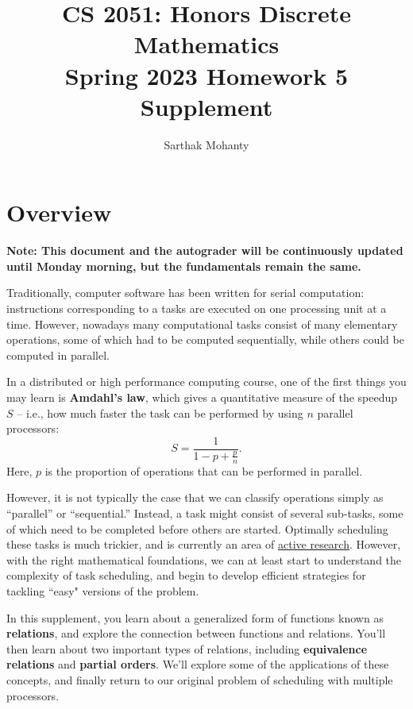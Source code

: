 \documentclass{article}
\title{\vspace{-1cm}CS 2051: Honors Discrete Mathematics \\Spring 2023 Homework 5 Supplement}
\author{Sarthak Mohanty }
\date{}
\begin{document}
\maketitle

\section*{Overview}
    \textbf{Note: This document and the autograder will be continuously updated until Monday morning, but the fundamentals remain the same.}

    \vspace{2mm}
    Traditionally, computer software has been written for serial computation: instructions corresponding to a tasks are executed on one processing unit at a time. However, nowadays many computational tasks consist of many elementary operations, some of which had to be computed sequentially, while others could be computed in parallel. 

    \vspace{2mm}
    In a distributed or high performance computing course, one of the first things you may learn is \textbf{Amdahl’s law}, which gives a quantitative measure of the speedup $S$ -- i.e., how much faster the task can be performed by using $n$ parallel processors: $$S = \frac{1}{1 - p + \frac{p}{n}}.$$ Here, $p$ is the proportion of operations that can be performed in parallel.


    \vspace{2mm}
    However, it is not typically the case that we can classify operations simply as “parallel” or “sequential.” Instead, a task might consist of several sub-tasks, some of which need to be completed before others are started. Optimally scheduling these tasks is much trickier, and is currently an area of \href{https://www.cs.umd.edu/~samir/DCscheduling18/slides/Janardhan%20Kulkarni.pdf}{active research}. However, with the right mathematical foundations, we can at least start to understand the complexity of task scheduling, and begin to develop efficient strategies for tackling ``easy" versions of the problem.

    \vspace{2mm}
    In this supplement, you learn about a generalized form of functions known as \textbf{relations}, and explore the connection between functions and relations. You'll then learn about two important types of relations, including \textbf{equivalence relations} and \textbf{partial orders}. We'll explore some of the applications of these concepts, and finally return to our original problem of scheduling with multiple processors.
\end{document}
